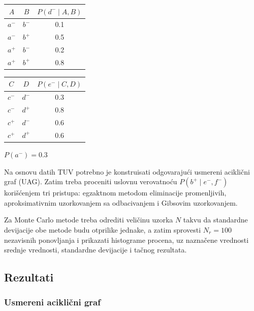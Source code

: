\documentclass[12pt,a4paper]{article}
\begin{document}
\vspace{0.5em}

\begin{center}
\begin{tabular}{cc|c}
  $A$ & $B$ & $P(d^- \mid A, B)$ \\ \hline
  $a^-$ & $b^-$ & 0.1 \\
  $a^-$ & $b^+$ & 0.5 \\
  $a^+$ & $b^-$ & 0.2 \\
  $a^+$ & $b^+$ & 0.8 \\
\end{tabular}
\qquad
\begin{tabular}{cc|c}
  $C$ & $D$ & $P(e^- \mid C, D)$ \\ \hline
  $c^-$ & $d^-$ & 0.3 \\
  $c^-$ & $d^+$ & 0.8 \\
  $c^+$ & $d^-$ & 0.6 \\
  $c^+$ & $d^+$ & 0.6 \\
\end{tabular}
\end{center}

\vspace{0.3em}
\begin{center}
  $P(a^-) = 0.3$
\end{center}

Na osnovu datih TUV potrebno je konstruisati odgovarajući usmereni aciklični graf (UAG).
Zatim treba proceniti uslovnu verovatnoću $P(b^+\mid e^-,f^-)$ korišćenjem tri pristupa:
egzaktnom metodom eliminacije promenljivih, aproksimativnim uzorkovanjem sa odbacivanjem
i Gibsovim uzorkovanjem.

Za Monte Carlo metode treba odrediti veličinu uzorka $N$ takvu da standardne devijacije obe
metode budu otprilike jednake, a zatim sprovesti $N_r = 100$ nezavisnih ponovljanja i prikazati
histograme procena, uz naznačene vrednosti srednje vrednosti, standardne devijacije i tačnog
rezultata.

\subsection{Rezultati}

\subsubsection*{Usmereni aciklični graf}
\end{document}

